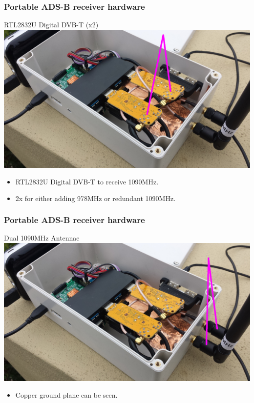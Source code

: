 \begin{frame}
\frametitle{Portable ADS-B receiver hardware}
\begin{block}{RTL2832U Digital DVB-T (x2)}
\includegraphics[height=0.5\textheight]{image/adsb-hardware-dvb.png}
\begin{itemize}
\item RTL2832U Digital DVB-T to receive 1090MHz.
\item 2x for either adding 978MHz or redundant 1090MHz.
\end{itemize}
\end{block}
\end{frame}

\begin{frame}
\frametitle{Portable ADS-B receiver hardware}
\begin{block}{Dual 1090MHz Antennae}
\includegraphics[height=0.5\textheight]{image/adsb-hardware-antennae.png}
\begin{itemize}
\item Copper ground plane can be seen.
\end{itemize}
\end{block}
\end{frame}


